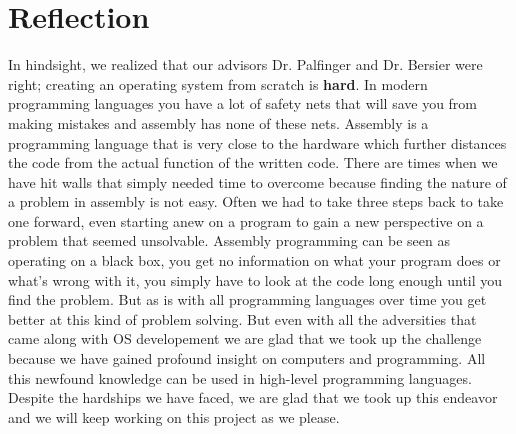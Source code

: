 \section{Reflection}

In hindsight, we realized that our advisors Dr. Palfinger and Dr. Bersier were right; creating 
an operating system from scratch is \textbf{hard}. In modern programming languages you have a
lot of safety nets that will save you from making mistakes and assembly has none of these nets.
Assembly is a programming language that is very close to the hardware which further distances 
the code from the actual function of the written code. There are times when we have hit
walls that simply needed time to overcome because finding the nature of a problem in assembly
is not easy. Often we had to take three steps back to take one forward, even starting anew on
a program to gain a new perspective on a problem that seemed unsolvable. Assembly programming 
can be seen as operating on a black box, you get no information on what your program does or
what's wrong with it, you simply have to look at the code long enough until you find the problem.
But as is with all programming languages over time you get better at this kind of problem solving.
But even with all the adversities that came along with OS developement we are glad that we took up
the challenge because we have gained profound insight on computers and programming. All this
newfound knowledge can be used in high-level programming languages. Despite the hardships we have 
faced, we are glad that we took up this endeavor and we will keep working on this project as we please.
